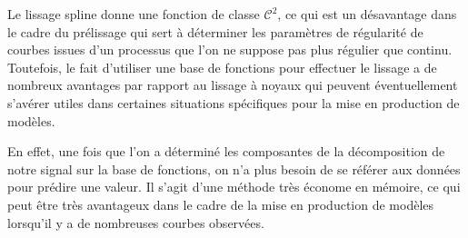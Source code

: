Le lissage spline donne une fonction de classe $\mathcal C^2$, ce qui est un désavantage dans le cadre du prélissage qui sert à déterminer les paramètres de régularité de courbes issues d'un processus que l'on ne suppose pas plus régulier que continu. Toutefois, le fait d'utiliser une base de fonctions pour effectuer le lissage a de nombreux avantages par rapport au lissage à noyaux qui peuvent éventuellement s'avérer utiles dans certaines situations spécifiques pour la mise en production de modèles.

En effet, une fois que l'on a déterminé les composantes de la décomposition de notre signal sur la base de fonctions, on n'a plus besoin de se référer aux données pour prédire une valeur. Il s'agit d'une méthode très économe en mémoire, ce qui peut être très avantageux dans le cadre de la mise en production de modèles lorsqu'il y a de nombreuses courbes observées.



